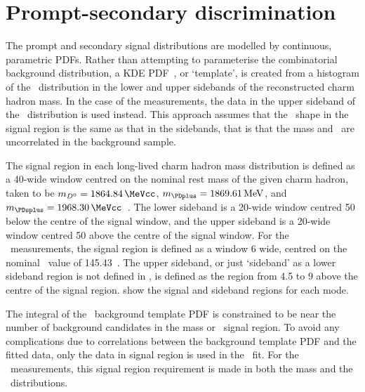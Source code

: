 \section{Prompt-secondary discrimination}
\label{chap:prod:fitting:ipchisq}

The prompt and secondary signal distributions are modelled by continuous, 
parametric \acp{PDF}.
Rather than attempting to parameterise the combinatorial background 
distribution, a \acf{KDE} \ac{PDF}~\cite{Poluektov:2014rxa}, or `template', is 
created from a histogram of the \lnipchisq\ distribution in the lower and upper 
sidebands of the reconstructed charm hadron mass.
In the case of the \PDstarp measurements, the data in the upper sideband of the 
\deltam\ distribution is used instead.
This approach assumes that the \lnipchisq\ shape in the signal region is the 
same as that in the sidebands, that is that the mass and \lnipchisq\ are 
uncorrelated in the background sample.

The signal region in each long-lived charm hadron mass distribution is defined 
as a \SI{40}{\MeVcc}-wide window centred on the nominal rest mass of the given 
charm hadron, taken to be $m_{\PDzero} = \SI{1864.84}{\MeVcc}$, $m_{\PDplus} = 
\SI{1869.61}{MeV}$, and $m_{\PDsplus} = \SI{1968.30}{\MeVcc}$~\cite{PDG2014}.
The lower sideband is a \SI{20}{\MeVcc}-wide window centred \SI{50}{\MeVcc} 
below the centre of the signal window, and the upper sideband is a 
\SI{20}{\MeVcc}-wide window centred \SI{50}{\MeVcc} above the centre of the 
signal window.
For the \PDstarp\ measurements, the signal region is defined as a window 
\SI{6}{\MeVcc} wide, centred on the nominal \deltam\ value of 
\SI{145.43}{\MeVcc}~\cite{PDG2014}.
The upper sideband, or just `sideband' as a lower sideband region is not 
defined in \deltam, is defined as the region from \SI{4.5}{\MeVcc} to 
\SI{9}{\MeVcc} above the centre of the signal region.
show the signal and sideband regions for each mode.

The integral of the \lnipchisq\ background template \ac{PDF} is constrained to 
be near the number of background candidates in the mass or \deltam\ signal 
region.
To avoid any complications due to correlations between the background template 
\ac{PDF} and the fitted data, only the data in signal region is used in the 
\lnipchisq\ fit.
For the \PDstarp\ measurements, this signal region requirement is made in both 
the \PDzero mass and the \deltam\ distributions.

